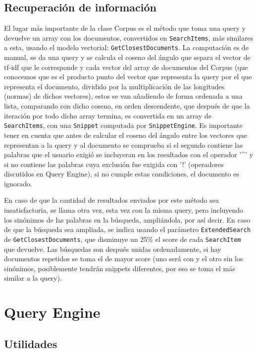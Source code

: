 \documentclass[a4paper, 12pt]{article}
\begin{document}
\subsection{Recuperación de información}

El lugar más importante de la clase Corpus es el método que toma una
query y devuelve un array con los documentos, convertidos en \texttt{SearchItems}, más
similares a esta, usando el modelo vectorial: \texttt{GetClosestDocuments}. La
computación es de manual, se da una query y se calcula el coseno del ángulo que separa el vector de
tf-idf que le corresponde y cada vector del array de documentos
del Corpus (que conocemos que es el producto punto del vector que representa
la query por el que representa el documento, dividido por la multiplicación de las
longitudes (normas) de dichos vectores), estos se van añadiendo de forma
ordenada a una lista, comparando con dicho coseno, en orden descendente, que
después de que la iteración por todo dicho array termina, es convertida en un
array de \texttt{SearchItems}, con una \texttt{Snippet} computada por \texttt{SnippetEngine}. Es
importante tener en cuenta que antes de calcular el coseno del ángulo entre los vectores que
representan a la query y al documento se comprueba si el segundo contiene las
palabras que el usuario exigió se incluyeran en los resultados con el operador '\^{}'
y si no contiene las palabras cuya exclusión fue exigida con '!' (operadores
discutidos en Query Engine), si no cumple estas condiciones, el documento es
ignorado.

En caso de que la cantidad de resultados enviados por este método sea
insatisfactoria, se llama otra vez, esta vez con la misma query, pero incluyendo
los sinónimos de las palabras en la búsqueda, ampliándola, por así decir. En
caso de que la búsqueda sea ampliada, se indica usando el parámetro
\texttt{ExtendedSearch} de \texttt{GetClosestDocuments}, que disminuye un 25\% el score de
cada \texttt{SearchItem} que devuelve. Las búsquedas son después unidas 
ordenadamente, si hay documentos repetidos se toma el de mayor score (uno
será con y el otro sin los sinónimos, posiblemente tendrán snippets diferentes,
por eso se toma el más similar a la query).

\section{Query Engine}

\subsection{Utilidades}
\end{document}
